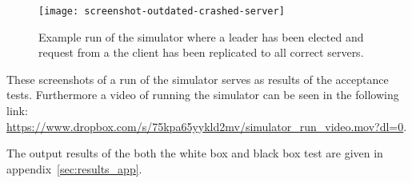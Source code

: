 \begin{figure}[H]
\centering
\texttt{[image: screenshot-outdated-crashed-server]}
\caption{Example run of the simulator where a leader has been elected and request from a the client has been replicated to all correct servers.}
\label{fig:example3}
\end{figure}
These screenshots of a run of the simulator serves as results of the acceptance tests.
Furthermore a video of running the simulator can be seen in the following link:\\ \url{https://www.dropbox.com/s/75kpa65yykld2mv/simulator_run_video.mov?dl=0}.

The output results of the both the white box and black box test are given in appendix~\ref{sec:results_app}. 